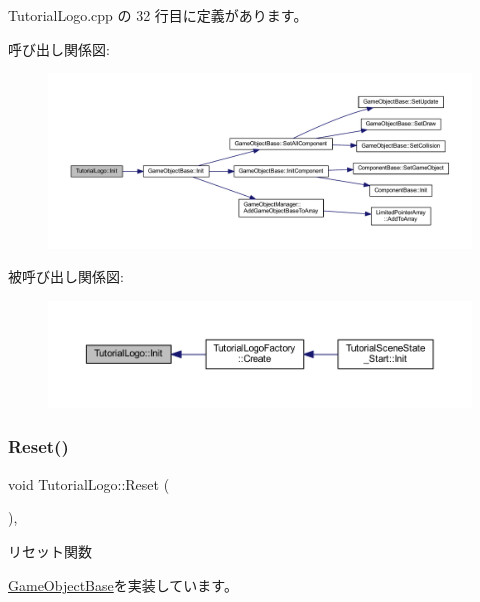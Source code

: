  Tutorial\+Logo.\+cpp の 32 行目に定義があります。

呼び出し関係図\+:\nopagebreak
\begin{figure}[H]
\begin{center}
\leavevmode
\includegraphics[width=350pt]{class_tutorial_logo_a590f017a6b0532d08c1377b90b8fba3f_cgraph}
\end{center}
\end{figure}
被呼び出し関係図\+:\nopagebreak
\begin{figure}[H]
\begin{center}
\leavevmode
\includegraphics[width=350pt]{class_tutorial_logo_a590f017a6b0532d08c1377b90b8fba3f_icgraph}
\end{center}
\end{figure}
\mbox{\label{class_tutorial_logo_a2c9e22c81cfeafbd34f50cc766a66cf1}} 
\subsubsection{\texorpdfstring{Reset()}{Reset()}}
{\footnotesize\ttfamily void Tutorial\+Logo\+::\+Reset (\begin{DoxyParamCaption}{ }\end{DoxyParamCaption})\hspace{0.3cm}{\ttfamily [override]}, {\ttfamily [virtual]}}



リセット関数 



\mbox{\hyperlink{class_game_object_base_a85c59554f734bcb09f1a1e18d9517dce}{Game\+Object\+Base}}を実装しています。



